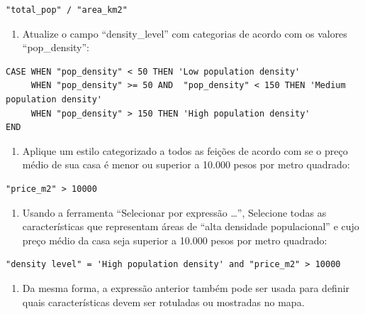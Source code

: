 \documentclass[
]{book}
\providecommand{\tightlist}{%
  \setlength{\itemsep}{0pt}\setlength{\parskip}{0pt}}
\begin{document}
\begin{verbatim}
"total_pop" / "area_km2"
\end{verbatim}

\begin{enumerate}
\def\labelenumi{\arabic{enumi}.}
\setcounter{enumi}{1}
\tightlist
\item
  Atualize o campo ``density\_level'' com categorias de acordo com os valores ``pop\_density'':
\end{enumerate}

\begin{verbatim}
CASE WHEN "pop_density" < 50 THEN 'Low population density'
     WHEN "pop_density" >= 50 AND  "pop_density" < 150 THEN 'Medium population density'
     WHEN "pop_density" > 150 THEN 'High population density'
END
\end{verbatim}

\begin{enumerate}
\def\labelenumi{\arabic{enumi}.}
\setcounter{enumi}{2}
\tightlist
\item
  Aplique um estilo categorizado a todos as feições de acordo com se o preço médio de sua casa é menor ou superior a 10.000 pesos por metro quadrado:
\end{enumerate}

\begin{verbatim}
"price_m2" > 10000
\end{verbatim}

\begin{enumerate}
\def\labelenumi{\arabic{enumi}.}
\setcounter{enumi}{3}
\tightlist
\item
  Usando a ferramenta ``Selecionar por expressão \ldots{}'', Selecione todas as características que representam áreas de ``alta densidade populacional'' e cujo preço médio da casa seja superior a 10.000 pesos por metro quadrado:
\end{enumerate}

\begin{verbatim}
"density level" = 'High population density' and "price_m2" > 10000
\end{verbatim}

\begin{enumerate}
\def\labelenumi{\arabic{enumi}.}
\setcounter{enumi}{4}
\tightlist
\item
  Da mesma forma, a expressão anterior também pode ser usada para definir quais características devem ser rotuladas ou mostradas no mapa.
\end{enumerate}
\end{document}

